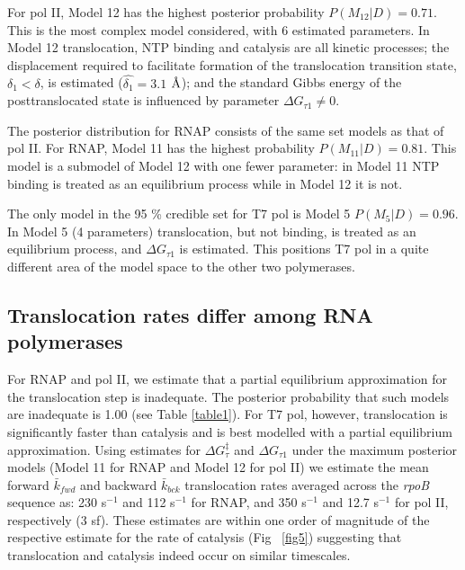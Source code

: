 \documentclass[10pt,letterpaper]{article}
\newcommand{\angstrom}{\mbox{\normalfont\AA}}
\begin{document}
For  pol II, Model 12 has the highest posterior probability $P(M_{12}|D) = 0.71$. This is the most complex model considered, with 6 estimated parameters. In Model 12 translocation, NTP binding and catalysis are all kinetic processes; the displacement required to facilitate formation of the translocation transition state, $\delta_1 < \delta$, is estimated ($\hat{\delta_1} = 3.1$ $\angstrom$); and the standard Gibbs energy of the posttranslocated state is influenced by parameter $\Delta G_{\tau 1} \neq 0$. \par

The posterior distribution for  RNAP  consists of the same set models as that of pol II. For RNAP, Model 11 has the highest probability $P(M_{11}|D) = 0.81$. This model is a submodel of Model 12 with one fewer parameter: in Model 11 NTP binding is treated as an equilibrium process while in Model 12 it is not. \par


The only model in the 95 \% credible set for T7 pol is Model 5 $P(M_{5}|D) = 0.96$. In Model 5 (4 parameters) translocation, but not binding, is treated as an equilibrium process, and $\Delta G_{\tau 1}$ is estimated. This positions T7 pol in a quite different area of the model space to the other two polymerases. \par










\subsection*{Translocation rates differ among RNA polymerases} For RNAP and pol II, we estimate that a partial equilibrium approximation for the translocation step is inadequate. The posterior probability that such models are inadequate is 1.00 (see Table \ref{table1}). For T7 pol, however, translocation is significantly faster than catalysis and is best modelled with a partial equilibrium approximation. Using estimates for $\Delta G_\tau^\ddag$ and $\Delta G_{\tau 1}$ under the maximum posterior models (Model 11 for RNAP and Model 12 for pol II) we estimate the mean forward $\bar{k}_{fwd}$ and backward $\bar{k}_{bck}$ translocation rates averaged across the \textit{ rpoB} sequence as:  230 s$^{-1}$ and 112 s$^{-1}$ for RNAP, and 350 s$^{-1}$ and 12.7 s$^{-1}$ for pol II, respectively (3 sf). These estimates are within one order of magnitude of the respective estimate for the rate of catalysis (Fig ~\ref{fig5}) suggesting that translocation and catalysis indeed occur on similar timescales.  \par
\end{document}
